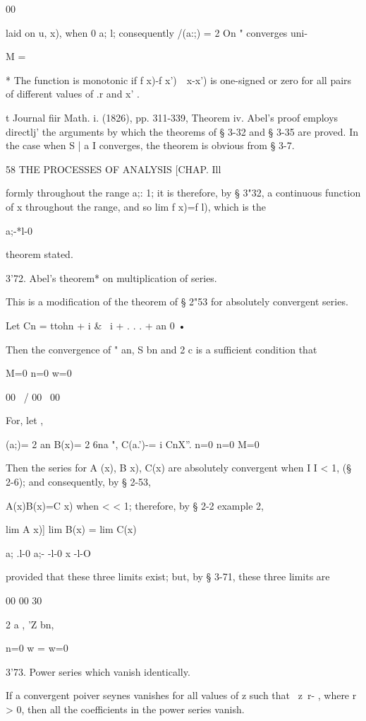00

laid on u, x), when 0 a; l; consequently /(a:;) = 2 On " converges
uni-

M =

* The function is monotonic if f x)-f x')\ \ x-x') is one-signed or
zero for all pairs of different values of .r and x' .

t Journal fiir Math. i. (1826), pp. 311-339, Theorem iv. Abel's proof
employs directlj' the arguments by which the theorems of § 3-32 and §
3-35 are proved. In the case when S | a I converges, the theorem is
obvious from § 3-7.



58 THE PROCESSES OF ANALYSIS [CHAP. Ill

formly throughout the range a;: 1; it is therefore, by § 3"32, a
continuous function of x throughout the range, and so lim f x)=f l),
which is the

a;-*l-0

theorem stated.

3'72. Abel's theorem* on multiplication of series.

This is a modification of the theorem of § 2"53 for absolutely
convergent series.

Let Cn = ttohn + i \& \ i + . . . + an 0 •

Then the convergence of " an, S bn and 2 c is a sufficient condition
that

M=0 n=0 w=0

 00 \ / 00 \ 00

For, let ,

 (a;)= 2 an B(x)= 2 6na ", C(a.')-= i CnX''. n=0 n=0 M=0

Then the series for A (x), B x), C(x) are absolutely convergent when I
I < 1, (§ 2-6); and consequently, by § 2-53,

A(x)B(x)=C x) when < < 1; therefore, by § 2-2 example 2,

  lim A x)] lim B(x) = lim C(x)\

a; .l-0 a;- -l-0 x -l-O

provided that these three limits exist; but, by § 3-71, these three
limits are

00 00 30

2 a , 'Z bn, %

n=0 w = w=0

3'73. Power series which vanish identically.

If a convergent poiver seynes vanishes for all values of z such that \
z\ r- , where r > 0, then all the coefficients in the power series
vanish.

